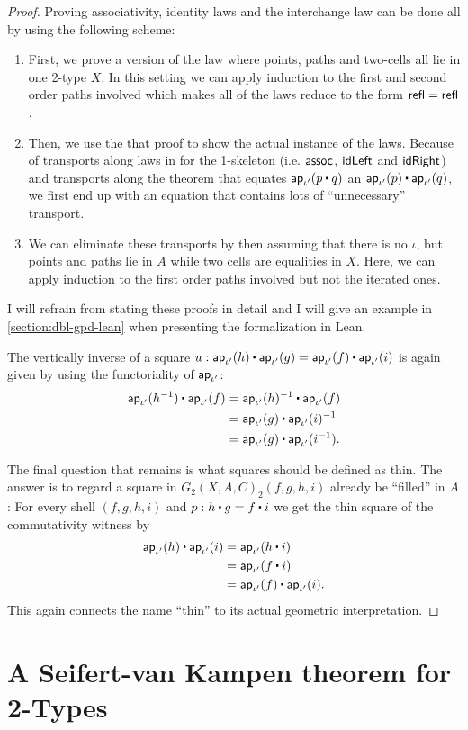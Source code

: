 \begin{proof}
Proving associativity, identity laws and the interchange law can be done all by
using the following scheme:
\begin{enumerate}
\item First, we prove a version of the law where points, paths and two-cells
all lie in one 2-type $X$.
In this setting we can apply induction to the first and second order paths involved
which makes all of the laws reduce to the form $\mathsf{refl} = \mathsf{refl}$.
\item Then, we use the that proof to show the actual instance of the laws.
Because of transports along laws in for the 1-skeleton 
(i.e. $\mathsf{assoc}$, $\mathsf{idLeft}$ and $\mathsf{idRight}$) and transports along the theorem that
equates $\apiop(p \ct q)$ an $\apiop(p) \ct \apiop(q)$, we first end up with an
equation that contains lots of ``unnecessary'' transport. 
\item We can eliminate these
transports by then assuming that there is no $\iota$, but points and paths
lie in $A$ while two cells are equalities in $X$.
Here, we can apply induction to the first order paths involved but not the iterated ones.
\end{enumerate}
I will refrain from stating these proofs in detail and I will give an example in
\ref{section:dbl-gpd-lean} when presenting the formalization in Lean. %

The vertically inverse of a square $u : \apiop(h) \ct \apiop(g) 
= \apiop(f) \ct \apiop(i)$ is again given by using the functoriality
of $\mathsf{ap}_{\iota'}$:
\begin{align*}
\apiop(h\inv) \ct \apiop(f) &= \apiop(h)\inv \ct \apiop(f) \\
	&= \apiop(g) \ct \apiop(i)\inv \\
	&= \apiop(g) \ct \apiop(i\inv) \text{.} \\	
\end{align*}

The final question that remains is what squares should be defined as thin.
The answer is to regard a square in $G_2(X,A,C)_2(f,g,h,i)$ already be ``filled''
in $A$: For every shell $(f,g,h,i)$ and $p : h \ct g = f \ct i$ we get the thin
square of the commutativity witness by
\begin{align*}
\apiop(h) \ct \apiop(i) &= \apiop(h \ct i) \\
	&= \apiop(f \ct i) \\
	&= \apiop(f) \ct \apiop(i) \text{.}
\end{align*}
This again connects the name ``thin'' to its actual geometric interpretation.
\end{proof}

\section{A Seifert-van Kampen theorem for 2-Types}

